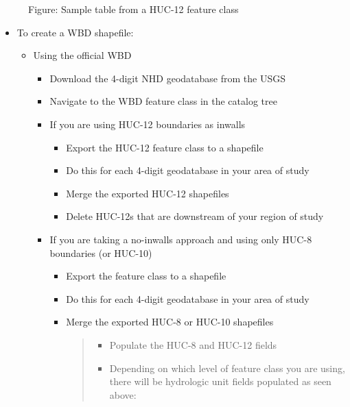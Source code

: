 \documentclass[letterpaper,10pt,english]{sphinxmanual}
\begin{document}
\begin{figure}[htbp]
\centering
\capstart

\noindent{}
\caption{Figure: Sample table from a HUC-12 feature class}\label{\detokenize{ex_1:id4}}\end{figure}
\begin{itemize}
\item {} 
To create a WBD shapefile:
\begin{itemize}
\item {} 
Using the official WBD
\begin{itemize}
\item {} 
Download the 4-digit NHD geodatabase from the USGS

\item {} 
Navigate to the WBD feature class in the catalog tree

\item {} 
If you are using HUC-12 boundaries as inwalls
\begin{itemize}
\item {} 
Export the HUC-12 feature class to a shapefile

\item {} 
Do this for each 4-digit geodatabase in your area of study

\item {} 
Merge the exported HUC-12 shapefiles

\item {} 
Delete HUC-12s that are downstream of your region of study

\end{itemize}

\item {} 
If you are taking a no-inwalls approach and using only HUC-8 boundaries (or HUC-10)
\begin{itemize}
\item {} 
Export the feature class to a shapefile

\item {} 
Do this for each 4-digit geodatabase in your area of study

\item {} 
Merge the exported HUC-8 or HUC-10 shapefiles
\begin{quote}
\begin{itemize}
\item {} 
Populate the HUC-8 and HUC-12 fields

\item {} 
Depending on which level of feature class you are using, there will be hydrologic unit fields populated as seen above:


\end{itemize}
\end{quote}
\end{itemize}
\end{itemize}
\end{itemize}
\end{itemize}
\end{document}
